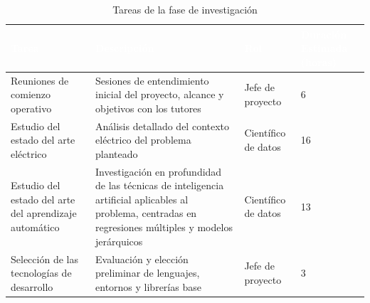\begin{table}[htp]
	\centering
		\begin{tabular}{ | m{4cm} | m{6cm} | m{2cm} | m{2cm} | }
			\hline
			\rowcolor[HTML]{5B9BD5} 
			\textcolor{white}{\textbf{Tarea}} & \textcolor{white}{\textbf{Descripción}} & \textcolor{white}{\textbf{Rol}} & \textcolor{white}{\textbf{Duración Estimada (horas)}} \\
			\hline
			
			Reuniones de comienzo operativo & Sesiones de entendimiento inicial del proyecto, alcance y objetivos con los tutores & Jefe de proyecto & 6 \\
			\hline
			Estudio del estado del arte eléctrico & Análisis detallado del contexto eléctrico del problema planteado & Científico de datos & 16 \\
			\hline
			Estudio del estado del arte del aprendizaje automático & Investigación en profundidad de las técnicas de inteligencia artificial aplicables al problema, centradas en regresiones múltiples y modelos jerárquicos & Científico de datos & 13 \\
			\hline
			Selección de las tecnologías de desarrollo & Evaluación y elección preliminar de lenguajes, entornos y librerías base & Jefe de proyecto & 3 \\
			\hline
			
		\end{tabular} 
		
		\caption{Tareas de la fase de investigación}
	\end{table}